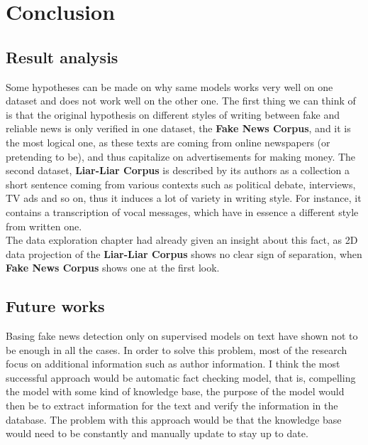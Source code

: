 ﻿\chapter{Conclusion}
\section{Result analysis}
Some hypotheses can be made on why same models works very well on one dataset and does not work well on the other one. The first thing we can think of is that the original hypothesis on different styles of writing between fake and reliable news is only verified in one dataset, the \textbf{Fake News Corpus}, and it is the most logical one, as these texts are coming from online newspapers (or pretending to be), and thus capitalize on advertisements for making money. The second dataset, \textbf{Liar-Liar Corpus} is described by its authors as a collection a short sentence coming from various contexts such as political debate, interviews, TV ads and so on, thus it induces a lot of variety in writing style. For instance, it contains a transcription of vocal messages, which have in essence a different style from written one. \\
The data exploration chapter had already given an insight about this fact, as 2D data projection of the \textbf{Liar-Liar Corpus} shows no clear sign of separation, when \textbf{Fake News Corpus} shows one at the first look. 
\section{Future works}
Basing fake news detection only on supervised models on text have shown not to be enough in all the cases. In order to solve this problem, most of the research focus on additional information such as author information. I think the most successful approach would be automatic fact checking model, that is, compelling the model with some kind of knowledge base, the purpose of the model would then be to extract information for the text and verify the information in the database. The problem with this approach would be that the knowledge base would need to be constantly and manually update to stay up to date.